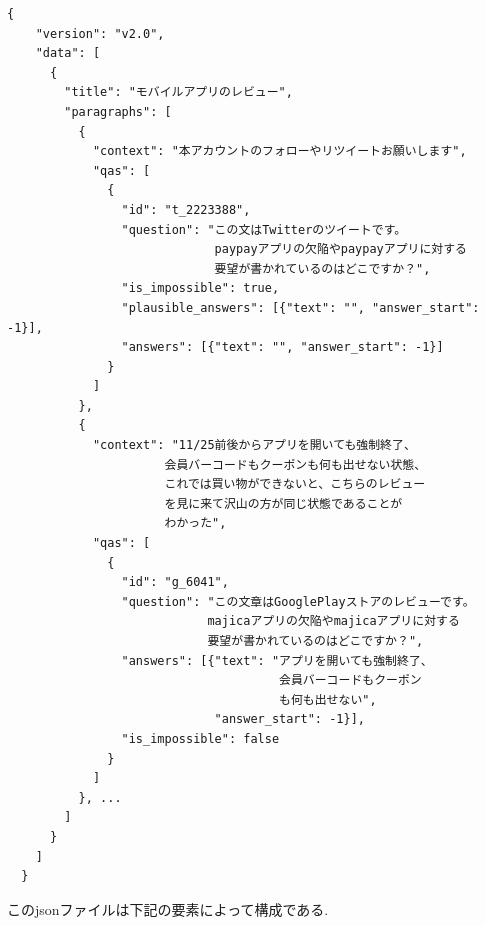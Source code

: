 \begin{lstlisting}[caption=データセット.json,label=json]
  {
    "version": "v2.0", 
    "data": [
      {
        "title": "モバイルアプリのレビュー", 
        "paragraphs": [
          {
            "context": "本アカウントのフォローやリツイートお願いします",
            "qas": [
              {
                "id": "t_2223388",
                "question": "この文はTwitterのツイートです。
                             paypayアプリの欠陥やpaypayアプリに対する
                             要望が書かれているのはどこですか？",
                "is_impossible": true,
                "plausible_answers": [{"text": "", "answer_start": -1}],
                "answers": [{"text": "", "answer_start": -1}]
              }
            ]
          },
          {
            "context": "11/25前後からアプリを開いても強制終了、
                      会員バーコードもクーポンも何も出せない状態、
                      これでは買い物ができないと、こちらのレビュー
                      を見に来て沢山の方が同じ状態であることが
                      わかった",
            "qas": [
              {
                "id": "g_6041", 
                "question": "この文章はGooglePlayストアのレビューです。
                            majicaアプリの欠陥やmajicaアプリに対する
                            要望が書かれているのはどこですか？",
                "answers": [{"text": "アプリを開いても強制終了、
                                      会員バーコードもクーポン
                                      も何も出せない", 
                             "answer_start": -1}], 
                "is_impossible": false
              }
            ]
          }, ...
        ]
      }
    ]
  } 
\end{lstlisting}
\noindent
このjsonファイルは下記の要素によって構成である. 

